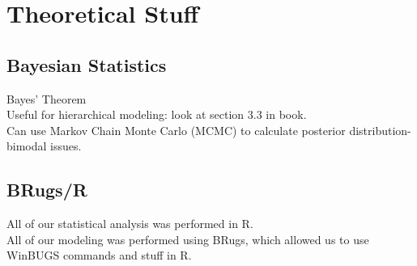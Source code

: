 \documentclass{article}
\begin{document}
\section{Theoretical Stuff} 
	\subsection{Bayesian Statistics}
	   	Bayes' Theorem \\
    	Useful for hierarchical modeling: look at section 3.3 in book. \\
    	Can use Markov Chain Monte Carlo (MCMC) to calculate posterior 
			distribution- bimodal issues.
	\subsection{BRugs/R}
    	All of our statistical analysis was performed in R.  \\
    	All of our modeling was performed using BRugs, which allowed us to use 
			WinBUGS commands and stuff in R.
\end{document}

